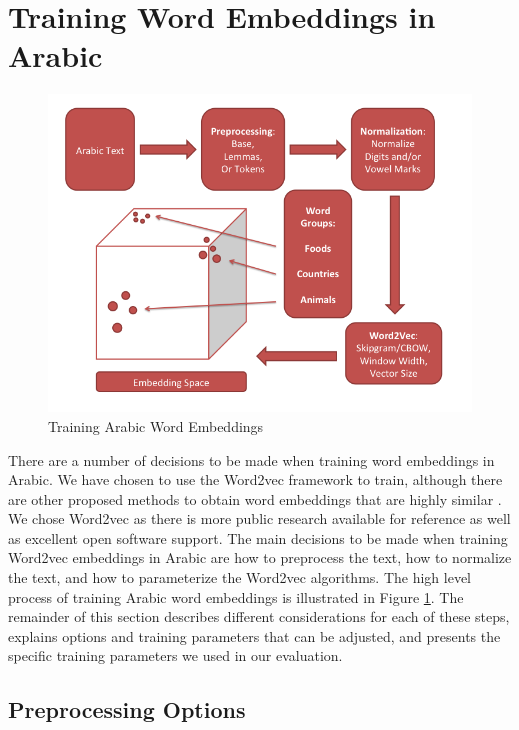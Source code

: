 \section{Training Word Embeddings in Arabic}
\label{sec:training}

\begin{figure}
\begin{center}
  \includegraphics[width=\linewidth]{diagrams/Slide1.png}
  \caption{Training Arabic Word Embeddings}
  \label{fig:training}
\end{center}
\end{figure}

There are a number of decisions to be made when training word embeddings in Arabic. We have chosen to use the Word2vec framework to train, although there are other proposed methods to obtain word embeddings that are highly similar \cite{pennington2014glove}. We chose Word2vec as there is more public research available for reference as well as excellent open software support. The main decisions to be made when training Word2vec embeddings in Arabic are how to preprocess the text, how to normalize the text, and how to parameterize the Word2vec algorithms. The high level process of training Arabic word embeddings is illustrated in Figure \ref{fig:training}. The remainder of this section describes different considerations for each of these steps, explains options and training parameters that can be adjusted, and presents the specific training parameters we used in our evaluation. 

\subsection{Preprocessing Options}

